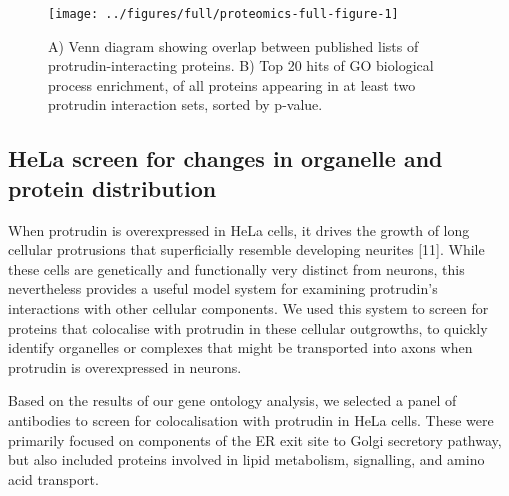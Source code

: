 \documentclass[
  12pt,
  a4paper,
]{book}
\begin{document}
\begin{figure}
\texttt{[image: ../figures/full/proteomics-full-figure-1]} \caption[Data set comparison and gene ontology of conserved protrudin-interacting proteins]{A) Venn diagram showing overlap between published lists of protrudin-interacting proteins. B) Top 20 hits of GO biological process enrichment, of all proteins appearing in at least two protrudin interaction sets, sorted by p-value.}\label{fig:proteomics-full-figure}
\end{figure}

\hypertarget{hela-screen-for-changes-in-organelle-and-protein-distribution}{%
\subsection{HeLa screen for changes in organelle and protein distribution}\label{hela-screen-for-changes-in-organelle-and-protein-distribution}}

When protrudin is overexpressed in HeLa cells, it drives the growth of long cellular protrusions that superficially resemble developing neurites {[}11{]}. While these cells are genetically and functionally very distinct from neurons, this nevertheless provides a useful model system for examining protrudin's interactions with other cellular components. We used this system to screen for proteins that colocalise with protrudin in these cellular outgrowths, to quickly identify organelles or complexes that might be transported into axons when protrudin is overexpressed in neurons.

Based on the results of our gene ontology analysis, we selected a panel of antibodies to screen for colocalisation with protrudin in HeLa cells. These were primarily focused on components of the ER exit site to Golgi secretory pathway, but also included proteins involved in lipid metabolism, signalling, and amino acid transport.
\end{document}
